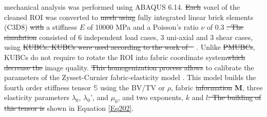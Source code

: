 \documentclass[a4paper,fleqn]{DC_ArtStyle}
\providecommand{\DIFadd}[1]{{\protect\color{blue}{#1}}} %
\providecommand{\DIFdel}[1]{{\protect\color{red}\sout{#1}}}                      %
\providecommand{\DIFaddbegin}{} %
\providecommand{\DIFaddend}{} %
\providecommand{\DIFdelbegin}{} %
\providecommand{\DIFdelend}{} %
\begin{document}
\DIFadd{A \si{\micro}FE }\DIFaddend mechanical analysis was performed using \textsc{ABAQUS 6.14}. \DIFdelbegin \DIFdel{Each }\DIFdelend \DIFaddbegin \DIFadd{In brief, each }\DIFaddend voxel of the cleaned ROI was converted to \DIFdelbegin \DIFdel{mesh using }\DIFdelend \DIFaddbegin \DIFadd{a }\DIFaddend fully integrated linear brick elements (C3D8) \DIFdelbegin \DIFdel{with }\DIFdelend \DIFaddbegin \DIFadd{using a direct voxel conversion approach. Then, }\DIFaddend a stiffness $E$ of 10\DIFaddbegin \DIFadd{,}\DIFaddend 000 MPa and a Poisson's ratio $\nu$ of 0.3 \DIFdelbegin \DIFdel{. The simulation }\DIFdelend \DIFaddbegin \DIFadd{were assigned. The homogenization process }\DIFaddend consisted of 6 independent \DIFaddbegin \DIFadd{simulations of different }\DIFaddend load cases, 3 uni-axial and 3 \DIFaddbegin \DIFadd{simple }\DIFaddend shear cases, using \DIFdelbegin \DIFdel{KUBCs. KUBCs were used according to the work of \mbox{%
\citeauthor{Panyasantisuk2015}}\hspace{0pt}%
}\DIFdelend \DIFaddbegin \DIFadd{kinematic uniform boundary conditions (KUBCs) }\DIFaddend \cite{Panyasantisuk2015}. Unlike \DIFdelbegin \DIFdel{PMUBCs}\DIFdelend \DIFaddbegin \DIFadd{periodicity-compatible mixed uniform boundary conditions (PMUBCs)}\DIFaddend , KUBCs do not require \DIFaddbegin \DIFadd{one }\DIFaddend to rotate the ROI into fabric coordinate system\DIFdelbegin \DIFdel{which decrease the }\DIFdelend \DIFaddbegin \DIFadd{. Such rotation would potentially decrease }\DIFaddend image quality. \DIFdelbegin \DIFdel{This homogenization process allows }\DIFdelend \DIFaddbegin \DIFadd{The homogenization process allowed to calculate the components of the stiffness tensor and }\DIFaddend to calibrate the parameters of the Zysset-Curnier fabric-elasticity model \cite{Zysset1995}. This model builds the fourth order stiffness tensor $\mathbb{S}$ using the BV/TV or $\rho$, fabric \DIFdelbegin \DIFdel{information }\DIFdelend \DIFaddbegin \DIFadd{tensor }\DIFaddend $\mathbf{M}$, three elasticity parameters $\lambda_0$, $\lambda_0$', and $\mu_0$, and two exponents, $k$ and $l$\DIFdelbegin \DIFdel{. The building of this tensor is }\DIFdelend \DIFaddbegin \DIFadd{, as }\DIFaddend shown in Equation \ref{Eq202}.\\
\end{document}
